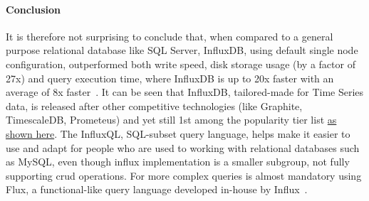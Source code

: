 \paragraph{Conclusion}
It is therefore not surprising to conclude that, when compared to a general purpose relational database like SQL Server, InfluxDB, using default single node configuration, outperformed both write speed, disk storage usage (by a factor of 27x) and query execution time, where InfluxDB is up to 20x faster with an average of 8x faster~\cite{Misc:noor_2017_universit}.
It can be seen that InfluxDB, tailored-made for Time Series data, is released after other competitive technologies (like Graphite, TimescaleDB, Prometeus) and yet still 1st among the popularity tier list \href{https://db-engines.com/en/ranking_trend/time+series+dbms}{as shown here}. 
The InfluxQL, SQL-subset query language, helps make it easier to use and adapt for people who are used to working with relational databases such as MySQL, even though influx
implementation is a smaller subgroup, not fully supporting \ac{crud} operations. For more complex queries is almost mandatory using Flux, a functional-like query language developed in-house by Influx~\cite{Misc:influx_docs}.
